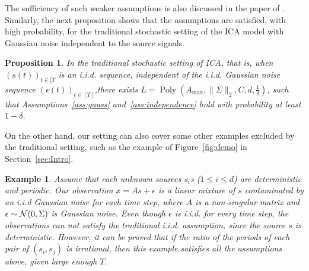 \documentclass{article}
\newcommand{\todoa}[2][]{ \todo[color=Purple!20,size=\tiny,#1]{#2}} %
\newcommand{\cN}{\cal{N}}
\newcommand{\iid}{i.i.d.\xspace}
\DeclareMathOperator{\pol}{Poly}
\newcommand{\poly}[1]{\pol\left(#1\right)}
\newtheorem{example}[lemma]{Example}
\newtheorem{prop}[lemma]{Proposition}
\theoremstyle{definition}
\newcommand{\eps}{\epsilon}
\begin{document}
The sufficiency of such weaker assumptions is also discussed in the paper of \citet{frieze1996learning}.
Similarly, the next proposition shows that the assumptions are satisfied, with high probability, for the traditional stochastic setting of the ICA model with Gaussian noise independent to the source signals.
\begin{prop}
\label{prop:stochasticAss}
In the traditional stochastic setting of ICA, that is, when $(s(t))_{t\in[T}$ is an \iid sequence, independent of the \iid Gaussian noise sequence $(\epsilon(t))_{t\in[T]}$,there exists $L = \poly{A_{\max}, \|\Sigma\|_2, C, d,\frac{1}{\delta}}$, such that Assumptions~\ref{ass:gauss} and~\ref{ass:independence} hold with probability at least $1-\delta$.
\end{prop}
On the other hand, our setting can also cover some other examples excluded by the traditional setting, such as the example of Figure~\ref{fig:demo} in Section~\ref{sec:Intro}.
\begin{example} \em
Assume that each unknown sources $s_i$s ($1\le i\le d$) are deterministic and periodic. Our observation $x=As+\eps$ is a linear mixture of $s$ contaminated by an i.i.d Gaussian noise for each time step, where $A$ is a non-singular matrix and $\eps\sim {\cN}(0,\Sigma)$ is Gaussian noise.   
Even though $\eps$ is i.i.d. for every time step, the observations can not satisfy the traditional i.i.d. assumption, since the source $s$ is deterministic. However, it can be proved that if the ratio of the periods of each pair of $(s_i, s_j)$ is irrational, then this example satisfies all the assumptions above, given large enough $T$.   
\end{example}
\end{document}
